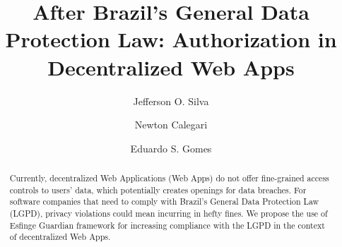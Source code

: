 \documentclass[sigconf]{acmart}
\begin{document}
%
\title{After Brazil's General Data Protection Law: Authorization in Decentralized Web Apps}

%
\author{Jefferson O. Silva}

\author{Newton Calegari}

\author{Eduardo S. Gomes}

%
\renewcommand{\shortauthors}{Silva et al.}

%
\begin{abstract}
Currently, decentralized Web Applications (Web Apps) do not offer fine-grained access controls to users' data, which potentially creates openings for data breaches. For software companies that need to comply with Brazil's General Data Protection Law (LGPD), privacy violations could mean incurring in hefty fines. We propose the use of Esfinge Guardian framework for increasing compliance with the LGPD in the context of decentralized Web Apps.
\end{abstract}

%

%
\maketitle
\end{document}
